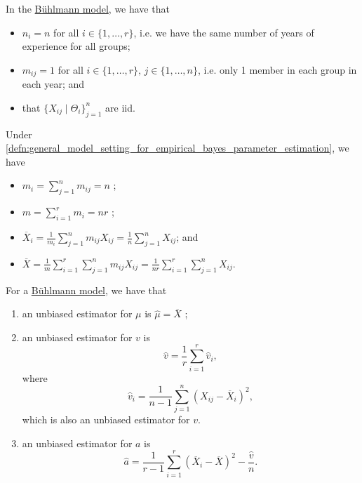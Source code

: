 \documentclass[notoc,notitlepage]{tufte-book}
\begin{document}
In the \hyperref[defn:the_buhlmann_model]{B\"{u}hlmann model},
we have that
\begin{itemize}
  \item $n_i = n$ for all $i \in \{1, \ldots, r\}$, i.e.
    we have the same number of years of experience for all groups;
  \item $m_{ij} = 1$ for all $i \in \{1, \ldots, r\},\, j \in \{1, \ldots, n\}$,
    i.e. only 1 member in each group in each year; and
  \item that $\{ X_{ij} \mid \Theta_i \}_{j=1}^{n}$ are iid.
\end{itemize}
Under
\cref{defn:general_model_setting_for_empirical_bayes_parameter_estimation},
we have
\begin{itemize}
  \item $m_i = \sum_{j=1}^{n} m_{ij} = n$ ;
  \item $m = \sum_{i=1}^{r} m_i = nr$ ;
  \item $\overline{X}_i = \frac{1}{m_i} \sum_{j=1}^{n} m_{ij} X_{ij} =
    \frac{1}{n} \sum_{j=1}^{n} X_{ij}$; and
  \item $\overline{X} = \frac{1}{m} \sum_{i=1}^{r} \sum_{j=1}^{n} m_{ij} X_{ij}
    = \frac{1}{nr} \sum_{i=1}^{r} \sum_{j=1}^{n} X_{ij}$.
\end{itemize}

\begin{propo}\label{propo:non_parametric_estimation_for_buhlmann_model}
  For a \hyperref[defn:the_buhlmann_model]{B\"{u}hlmann model},
  we have that
  \begin{enumerate}
    \item an unbiased estimator for $\mu$ is $\hat{\mu} = \overline{X}$ ;
    \item an unbiased estimator for $v$ is
      \begin{equation*}
        \hat{v} = \frac{1}{r} \sum_{i=1}^{r} \hat{v}_i,
      \end{equation*}
      where
      \begin{equation*}
        \hat{v}_i = \frac{1}{n-1} \sum_{j=1}^{n} (X_{ij} - \overline{X}_i)^2,
      \end{equation*}
      which is also an unbiased estimator for $v$.
    \item an unbiased estimator for $a$ is
      \begin{equation*}
        \hat{a} = \frac{1}{r-1} \sum_{i=1}^{r} (\overline{X}_i - \overline{X})^2
        - \frac{\hat{v}}{n}.
      \end{equation*}
  \end{enumerate}
\end{propo}
\end{document}
